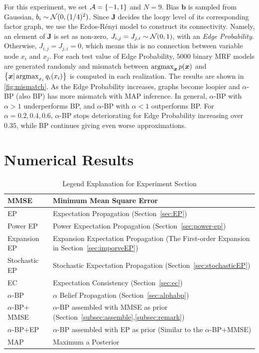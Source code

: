 \documentclass{article}
\begin{document}
For this experiment, we set $\mathcal{A} = \left\{ -1, 1 \right\}$ and $N=9$. Bias $\bm{b}$ is sampled from Gaussian, ${b_i} \sim \mathcal{N}(0, (1/4)^2)$. Since $\bm{J}$ decides the loopy level of its corresponding factor graph, we use the Erdos-Rényi model \cite{erdos1960} to construct its connectivity. Namely, an element of $\bm{J}$ is set as non-zero, $ {J}_{i,j} = {J}_{j,i} \sim \mathcal{N}(0,1)$, with an \textit{Edge Probability}. Otherwise, ${J}_{i, j} = {J}_{j,i} = 0$, which means this is no connection between variable node $x_i$ and $x_j$. For each test value of Edge Probability, $5000$ binary MRF models are generated randomly and mismatch between $\operatorname{argmax}_{\bm{x}} p(\bm{x})$ and $\left\{ \bm{x}|\operatorname{argmax}_{x_i}q_i(x_i) \right\}$ is computed in each realization. The results are shown in \autoref{fig:mismatch}. As the Edge Probability increases, graphs become loopier and $\alpha$-BP (also BP) has more mismatch with MAP inference. In general, $\alpha$-BP with $\alpha > 1$ underperforms BP, and $\alpha$-BP with $\alpha < 1$ outperforms BP. For $\alpha=0.2, 0.4, 0.6$, $\alpha$-BP stops deteriorating for Edge Probability increasing over $0.35$, while BP continues giving even worse approximations.

\newpage

\section{Numerical Results}

\begin{table}[!h]
  \caption{Legend Explanation for Experiment Section}\label{tab:legend}
  \centering
  \begin{tabular}{ |p{3cm}||p{8cm}|  }
    \hline
    MMSE   & Minimum Mean Square Error \\
    \hline
    EP   & Expectation Propagation (Section~\ref{sec:EP}) \\
    \hline
    Power EP & Power Expectation Propagation (Section~\ref{sec:power-ep}) \\
    \hline
    Expansion EP & Expansion Expectation Propagation (The First-order Expansion in Section~\ref{sec:imporveEP}) \\
    \hline
    Stochastic EP & Stochastic Expectation Propagation (Section~\ref{sec:stochasticEP}) \\
    \hline
    EC & Expectation Consistency (Section~\ref{sec:ec}) \\
    \hline
    $\alpha$-BP & $\alpha$ Belief Propagation (Section~\ref{sec:alphabp}) \\
    \hline
    $\alpha$-BP$+$MMSE & $\alpha$-BP assembled with MMSE as prior (Section~\ref{subsec:assemble},\ref{subsec:remark}) \\
    \hline
    $\alpha$-BP$+$EP & $\alpha$-BP assembled with EP as prior (Similar to the $\alpha$-BP$+$MMSE) \\
    \hline
    MAP & Maximum a Posterior \\
    \hline
  \end{tabular}
  \vspace{1cm}
\end{table}
\end{document}
